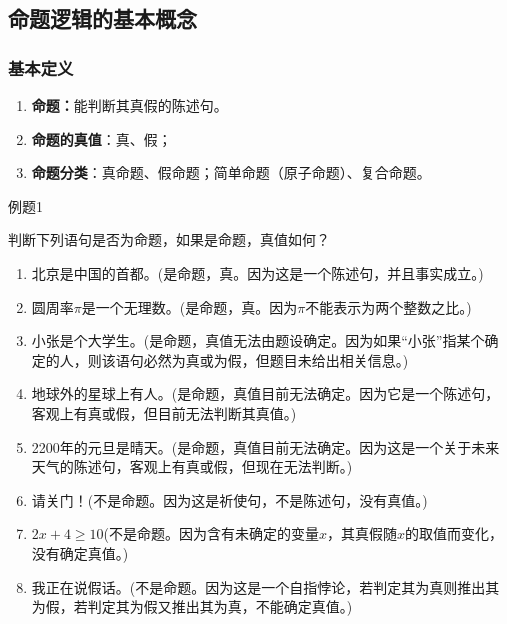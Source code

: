 \subsection{命题逻辑的基本概念}

\subsubsection{基本定义}

\begin{enumerate}
	\item \textbf{命题：}能判断其真假的陈述句。
	
	\item \textbf{命题的真值}：真、假；
	
	\item \textbf{命题分类}：真命题、假命题；简单命题（原子命题）、复合命题。
	
\end{enumerate}

\begin{question}{例题1}
	
	判断下列语句是否为命题，如果是命题，真值如何？
	\begin{enumerate}
		\item 北京是中国的首都。(是命题，真。因为这是一个陈述句，并且事实成立。)
		\item 圆周率$\pi$是一个无理数。(是命题，真。因为$\pi$不能表示为两个整数之比。)
		\item 小张是个大学生。(是命题，真值无法由题设确定。因为如果“小张”指某个确定的人，则该语句必然为真或为假，但题目未给出相关信息。)
		\item 地球外的星球上有人。(是命题，真值目前无法确定。因为它是一个陈述句，客观上有真或假，但目前无法判断其真值。)
		\item 2200年的元旦是晴天。(是命题，真值目前无法确定。因为这是一个关于未来天气的陈述句，客观上有真或假，但现在无法判断。)
		\item 请关门！(不是命题。因为这是祈使句，不是陈述句，没有真值。)
		\item $2x + 4 \ge 10$(不是命题。因为含有未确定的变量$x$，其真假随$x$的取值而变化，没有确定真值。)
		\item 我正在说假话。(不是命题。因为这是一个自指悖论，若判定其为真则推出其为假，若判定其为假又推出其为真，不能确定真值。)
	\end{enumerate}
	
\end{question}




